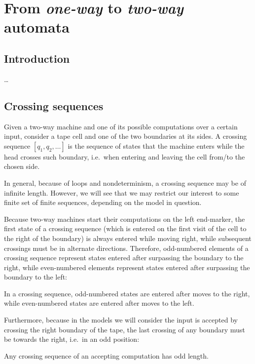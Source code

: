 \chapter{From \emph{one-way} to \emph{two-way} automata}



\section{Introduction}
\dots



\section{Crossing sequences}
Given a two-way machine and one of its possible computations over a certain input, consider a tape cell and one of the two boundaries at its sides.
A crossing sequence $[q_1,q_2,\dots]$ is the sequence of states that the machine enters while the head crosses such boundary, i.e.\ when entering and leaving the cell from/to the chosen side.

In general, because of loops and nondeterminism, a crossing sequence may be of infinite length.
However, we will see that we may restrict our interest to some finite set of finite sequences, depending on the model in question.

Because two-way machines start their computations on the left end-marker, the first state of a crossing sequence (which is entered on the first visit of the cell to the right of the boundary) is always entered while moving right, while subsequent crossings must be in alternate directions.
Therefore, odd-numbered elements of a crossing sequence represent states entered after surpassing the boundary to the right, while even-numbered elements represent states entered after surpassing the boundary to the left:
\begin{fact}\label{fact:crossing-parity}
	In a crossing sequence, odd-numbered states are entered after moves to the right, while even-numbered states are entered after moves to the left.
\end{fact}

Furthermore, because in the models we will consider the input is accepted by crossing the right boundary of the tape, the last crossing of any boundary must be towards the right, i.e.\ in an odd position:
\begin{fact}\label{fact:crossing-length}
	Any crossing sequence of an accepting computation has odd length.
\end{fact}


